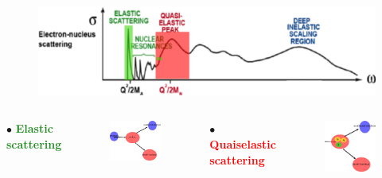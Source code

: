 \documentclass[12pt,usenames,dvipsnames]{beamer}
\begin{document}
\begin{frame}

\begin{figure}[]
\centering
\includegraphics[width=12cm]{../images/Thesis/E_nucleus_spect_QE.png}
\end{figure}
\vspace*{-0.5cm}
\begin{columns}[t] %
$\bullet$ \textbf{\textcolor{ForestGreen}{Elastic scattering}}\\
\begin{figure}[]
\includegraphics[width=3.5cm]{../images/elast_draw.png}
\end{figure}
$\bullet$ \textbf{\textcolor{red}{Quaiselastic scattering}}\\
\vspace{-20pt}
\begin{figure}[]
\includegraphics[width=3.5cm]{../images/quais_draw.png}
\end{figure}


\end{columns}
\end{frame}

\end{document}
